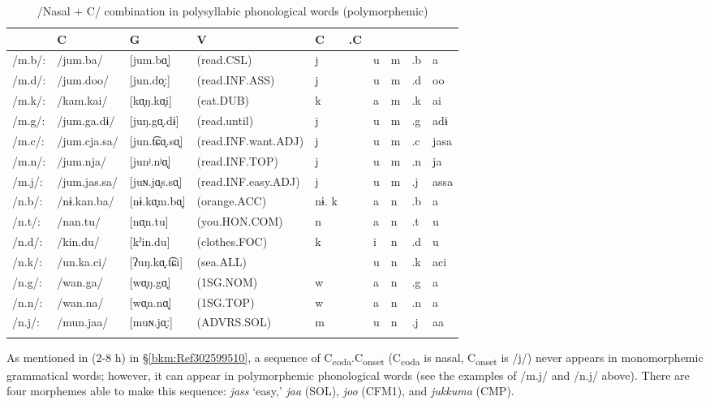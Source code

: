 \begin{table}\footnotesize
\caption{/Nasal + C/ combination in polysyllabic phonological words (polymorphemic)}
\begin{tabular}{ *{10}{l} }
\lsptoprule
 \multicolumn{4}{l}{} &  {C} & {G} & {V} & {C} & {.C} & {}\\\midrule
{/m.b/:} & {/jum.ba/}     & [jum.bɑ̟]      &  {(read.CSL)}          &   j   & &  u & m & .b &a\\
{/m.d/:} & {/jum.doo/}    & [jun.do̞ː]     &  {(read.INF.ASS)}      &   j   & &  u & m & .d &oo\\
{/m.k/:} & {/kam.kai/}    & [kɑ̟ŋ.kɑ̟i]    &   {(eat.DUB)}          &    k  & &   a&  m&  .k& ai\\
{/m.g/:} & {/jum.ga.dɨ/}  & [juŋ.gɑ̟.dɨ]   &  {(read.until)}        &   j   & &  u & m & .g &adɨ\\
{/m.c/:} & {/jum.cja.sa/} & [jun.t͡ɕɑ̟.sɑ̟]&   {(read.INF.want.ADJ)}&    j  &  &   u&  m&  .c& jasa\\
{/m.n/:} & {/jum.nja/}    & [junʲ.nʲɑ̟]    &  {(read.INF.TOP)}      &   j   & &  u & m & .n &ja\\
{/m.j/:} & {/jum.jas.sa/} & [juɴ.jɑ̟s.sɑ̟] &   {(read.INF.easy.ADJ)}&    j  & &   u&  m&  .j& assa\\
{/n.b/:} & {/nɨ.kan.ba/}  & [nɨ.kɑ̟m.bɑ̟]  &   {(orange.ACC)}       &    nɨ.   k  & &  a & n & .b & a\\
{/n.t/:} & {/nan.tu/}     & [nɑ̟n.tu]      &  {(you.HON.COM)}       &   n &   &  a  &  n& .t& u\\
{/n.d/:} & {/kin.du/}     & [kˀin.du]      & {(clothes.FOC)}        &  k &   & i   & n &.d &u\\
{/n.k/:} & {/un.ka.ci/}   & [ʔuŋ.kɑ̟.t͡ɕi] &  {(sea.ALL)}           & & &   u   &  n  &  .k & aci\\
{/n.g/:} & {/wan.ga/}     & [wɑ̟ŋ.gɑ̟]     &   {(1SG.NOM)}          &    w  & &   a &    n & .g & a\\
{/n.n/:} & {/wan.na/}     & [wɑ̟n.nɑ̟]     &   {(1SG.TOP)}          &    w  & &   a &   n & .n & a\\
{/n.j/:} & {/mun.jaa/}    & [muɴ.jɑ̟ː]     &  {(ADVRS.SOL)}         &   m   & &  u  &  n & .j & aa\\
\lspbottomrule
\end{tabular}
\end{table}

As mentioned in (2-8 h) in §\ref{bkm:Ref302599510}, a sequence of C\textsubscript{coda}.C\textsubscript{onset} (C\textsubscript{coda} is nasal, C\textsubscript{onset} is /j/) never appears in monomorphemic grammatical words; however, it can appear in polymorphemic phonological words (see the examples of /m.j/ and /n.j/ above). There are four morphemes able to make this sequence: \textit{jass} ‘easy,’ \textit{jaa} (SOL), \textit{joo} (CFM1), and \textit{jukkuma} (CMP).

